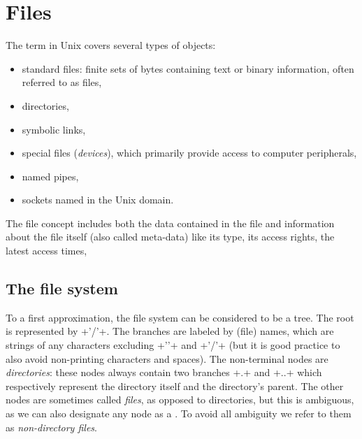 %
%

\chapter{\label{sec/files}Files}

The term  in Unix covers several types of objects:
%
\begin{itemize}
\item standard files: finite sets of bytes containing text or binary
  information, often referred to as  files,
%
\item directories,
%
\item symbolic links,
%
\item special files (\emph{devices}), which primarily provide access
  to computer peripherals,
%
\item named pipes,
%
\item sockets named in the Unix domain.
\end{itemize}
% 
The file concept includes both the data contained in the file and
information about the file itself (also called meta-data) like its
type, its access rights, the latest access times, {\etc}

\section{The file system}

To a first approximation, the file system can be considered to be a tree. The root is
represented by \ml+'/'+. The branches are labeled by (file) names,
which are strings of any characters excluding \ml+''+ and \ml+'/'+
(but it is good practice to also avoid non-printing characters and
spaces). The non-terminal nodes are \emph{directories}: these nodes
always contain two branches \ml+.+ and \ml+..+ which respectively
represent the directory itself and the directory's parent. The other
nodes are sometimes called \emph{files}, as opposed to directories,
but this is ambiguous, as we can also designate any node as a
. To avoid all ambiguity we refer to them as
\emph{non-directory files}.

